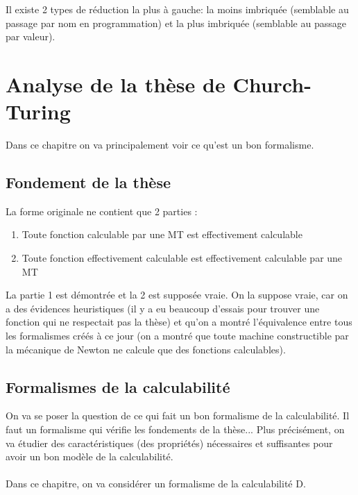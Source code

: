\begin{myrem}
	Il existe 2 types de réduction la plus à gauche: la moins imbriquée 
	(semblable au passage par nom en programmation) et la plus imbriquée 
	(semblable au passage par valeur).
\end{myrem}

\section{Analyse de la thèse de Church-Turing}
\label{sec:analyse_de_la_th_se_de_church_turing}
Dans ce chapitre on va principalement voir ce qu'est un bon formalisme.

\subsection{Fondement de la thèse}
\label{sub:fondement_de_la_th_se}
La forme originale ne contient que 2 parties :
\begin{enumerate}
	\item Toute fonction calculable par une MT est effectivement calculable
	\item Toute fonction effectivement calculable est effectivement 
		calculable par une MT 
\end{enumerate}
La partie 1 est démontrée et la 2 est supposée vraie. 
On la suppose vraie, car on a des évidences heuristiques (il y a eu beaucoup 
d'essais pour trouver une fonction qui ne respectait pas la thèse) et qu'on a montré 
l'équivalence entre tous les formalismes créés à ce jour (on a montré que toute 
machine constructible par la mécanique de Newton ne calcule que des fonctions 
calculables). 

\subsection{Formalismes de la calculabilité}
\label{sub:formalismes_de_la_calculabilit_}
On va se poser la question de ce qui fait un bon formalisme de la 
calculabilité. Il faut un formalisme qui vérifie les fondements de la 
thèse... Plus précisément, on va étudier des caractéristiques (des propriétés) 
nécessaires et suffisantes pour avoir un bon modèle de la calculabilité.

\paragraph{} Dans ce chapitre, on va considérer un formalisme de la 
calculabilité D.

